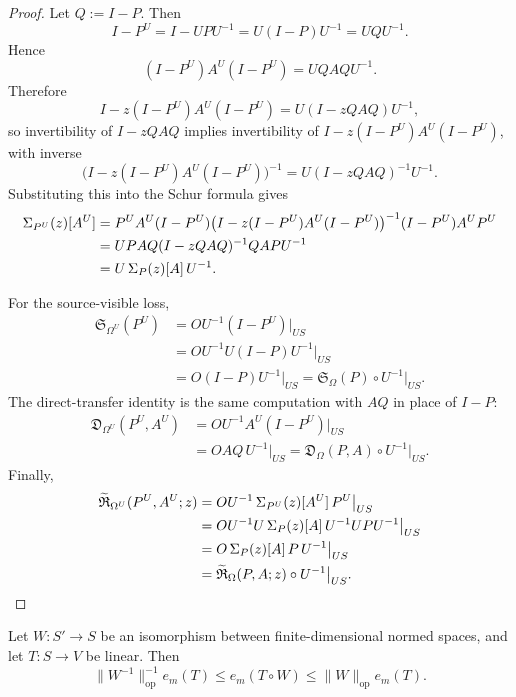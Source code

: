 \begin{proof}
Let \(Q:=I-P\). Then
\[
I-P^U
=
I-UPU^{-1}
=
U(I-P)U^{-1}
=
UQU^{-1}.
\]
Hence
\[
(I-P^U)A^U(I-P^U)
=
UQAQU^{-1}.
\]
Therefore
\[
I-z(I-P^U)A^U(I-P^U)
=
U(I-zQAQ)U^{-1},
\]
so invertibility of \(I-zQAQ\) implies invertibility of
\(I-z(I-P^U)A^U(I-P^U)\), with inverse
\[
\bigl(I-z(I-P^U)A^U(I-P^U)\bigr)^{-1}
=
U(I-zQAQ)^{-1}U^{-1}.
\]
Substituting this into the Schur formula gives
\begin{align*}
\Sigma_{P^U}(z)[A^U]
&=
P^U A^U (I-P^U)
\bigl(I-z(I-P^U)A^U(I-P^U)\bigr)^{-1}
(I-P^U)A^U P^U \\
&=
UPAQ(I-zQAQ)^{-1}QAPU^{-1} \\
&=
U\,\Sigma_{P}(z)[A]\,U^{-1}.
\end{align*}

For the source-visible loss,
\begin{align*}
\mathfrak S_{\Omega^U}(P^U)
&=
OU^{-1}(I-P^U)\big|_{US} \\
&=
OU^{-1}U(I-P)U^{-1}\big|_{US} \\
&=
O(I-P)U^{-1}\big|_{US}
=
\mathfrak S_{\Omega}(P)\circ U^{-1}\big|_{US}.
\end{align*}
The direct-transfer identity is the same computation with \(AQ\) in place of
\(I-P\):
\begin{align*}
\mathfrak D_{\Omega^U}(P^U,A^U)
&=
OU^{-1}A^U(I-P^U)\big|_{US} \\
&=
OAQ\,U^{-1}\big|_{US}
=
\mathfrak D_{\Omega}(P,A)\circ U^{-1}\big|_{US}.
\end{align*}
Finally,
\begin{align*}
\widetilde{\mathfrak R}_{\Omega^U}(P^U,A^U;z)
&=
OU^{-1}\,\Sigma_{P^U}(z)[A^U]\,P^U\big|_{US} \\
&=
OU^{-1}U\,\Sigma_{P}(z)[A]\,U^{-1}UPU^{-1}\big|_{US} \\
&=
O\,\Sigma_{P}(z)[A]\,P\,U^{-1}\big|_{US} \\
&=
\widetilde{\mathfrak R}_{\Omega}(P,A;z)\circ U^{-1}\big|_{US}.
\end{align*}
\end{proof}

\begin{proposition}
\label{prop:source-isomorphism-width-bounds}
Let \(W:S'\to S\) be an isomorphism between finite-dimensional normed spaces,
and let \(T:S\to V\) be linear. Then
\[
\|W^{-1}\|_{\mathrm{op}}^{-1}e_m(T)
\le
e_m(T\circ W)
\le
\|W\|_{\mathrm{op}}e_m(T).
\]
\end{proposition}

